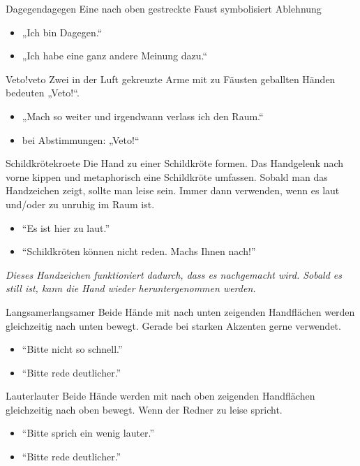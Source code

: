 \begin{handzeichen}[.2\linewidth]{Dagegen}{dagegen}
Eine nach oben gestreckte Faust symbolisiert Ablehnung
\begin{itemize}
	\item „Ich bin Dagegen.“
	\item „Ich habe eine ganz andere Meinung dazu.“
\end{itemize}
\end{handzeichen}

\begin{handzeichen}{Veto!}{veto}
Zwei in der Luft gekreuzte Arme mit zu Fäusten geballten Händen bedeuten „Veto!“.
\begin{itemize}
	\item „Mach so weiter und irgendwann verlass ich den Raum.“
	\item bei Abstimmungen: „Veto!“
\end{itemize}
\end{handzeichen}

\begin{handzeichen}{Schildkröte}{kroete}
Die Hand zu einer Schildkröte formen. Das Handgelenk nach vorne kippen und metaphorisch eine Schildkröte umfassen. Sobald man das Handzeichen zeigt, sollte man leise sein.
Immer dann verwenden, wenn es laut und/oder zu unruhig im Raum ist.
\begin{itemize}
	\item \enquote{Es ist hier zu laut.}
	\item \enquote{Schildkröten können nicht reden. Machs Ihnen nach!}
\end{itemize}
\end{handzeichen}

\emph{
    Dieses Handzeichen funktioniert dadurch, dass es nachgemacht wird.
    Sobald es still ist, kann die Hand wieder heruntergenommen werden.
}

\begin{handzeichen}{Langsamer}{langsamer}
Beide Hände mit nach unten zeigenden Handflächen werden gleichzeitig nach unten bewegt. Gerade bei starken Akzenten gerne verwendet.
\begin{itemize}
	\item \enquote{Bitte nicht so schnell.}
	\item \enquote{Bitte rede deutlicher.}
\end{itemize}
\end{handzeichen}

\begin{handzeichen}{Lauter}{lauter}
Beide Hände werden mit nach oben zeigenden Handflächen gleichzeitig nach oben bewegt.
Wenn der Redner zu leise spricht.
\begin{itemize}
	\item \enquote{Bitte sprich ein wenig lauter.}
	\item \enquote{Bitte rede deutlicher.}
\end{itemize}
\end{handzeichen}

